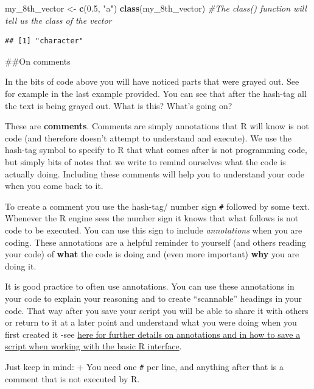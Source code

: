 \documentclass[]{book}
\newenvironment{Shaded}{\begin{snugshade}}{\end{snugshade}}
\newcommand{\CommentTok}[1]{\textcolor[rgb]{0.56,0.35,0.01}{\textit{#1}}}
\newcommand{\FloatTok}[1]{\textcolor[rgb]{0.00,0.00,0.81}{#1}}
\newcommand{\KeywordTok}[1]{\textcolor[rgb]{0.13,0.29,0.53}{\textbf{#1}}}
\newcommand{\NormalTok}[1]{#1}
\newcommand{\StringTok}[1]{\textcolor[rgb]{0.31,0.60,0.02}{#1}}
\theoremstyle{definition}
\theoremstyle{definition}
\theoremstyle{definition}
\theoremstyle{remark}
\begin{document}
\begin{Shaded}
\begin{Highlighting}[]
\NormalTok{my_8th_vector <-}\StringTok{ }\KeywordTok{c}\NormalTok{(}\FloatTok{0.5}\NormalTok{, }\StringTok{"a"}\NormalTok{)}
\KeywordTok{class}\NormalTok{(my_8th_vector) }\CommentTok{#The class() function will tell us the class of the vector}
\end{Highlighting}
\end{Shaded}

\begin{verbatim}
## [1] "character"
\end{verbatim}

\#\#On comments

In the bits of code above you will have noticed parts that were grayed
out. See for example in the last example provided. You can see that
after the hash-tag all the text is being grayed out. What is this?
What's going on?

These are \textbf{comments}. Comments are simply annotations that R will
know is not code (and therefore doesn't attempt to understand and
execute). We use the hash-tag symbol to specify to R that what comes
after is not programming code, but simply bits of notes that we write to
remind ourselves what the code is actually doing. Including these
comments will help you to understand your code when you come back to it.

To create a comment you use the hash-tag/ number sign \texttt{\#}
followed by some text. Whenever the R engine sees the number sign it
knows that what follows is not code to be executed. You can use this
sign to include \emph{annotations} when you are coding. These
annotations are a helpful reminder to yourself (and others reading your
code) of \textbf{what} the code is doing and (even more important)
\textbf{why} you are doing it.

It is good practice to often use annotations. You can use these
annotations in your code to explain your reasoning and to create
``scannable'' headings in your code. That way after you save your script
you will be able to share it with others or return to it at a later
point and understand what you were doing when you first created it -see
\href{http://www.screenr.com/1VN8}{here for further details on
annotations and in how to save a script when working with the basic R
interface}.

Just keep in mind: + You need one \texttt{\#} per line, and anything
after that is a comment that is not executed by R.
\end{document}
